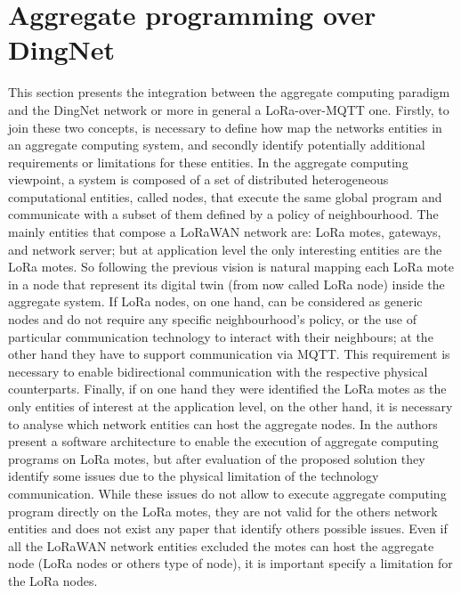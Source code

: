 \section{Aggregate programming over DingNet}
\label{sec:contributionACOverDingNet}
This section presents the integration between the aggregate computing paradigm and the DingNet network or more in general a LoRa-over-MQTT one.
Firstly, to join these two concepts, is necessary to define how map the networks entities in an aggregate computing system, and secondly identify potentially additional requirements or limitations for these entities.
In the aggregate computing viewpoint, a system is composed of a set of distributed heterogeneous computational entities, called nodes, that execute the same global program and communicate with a subset of them defined by a policy of neighbourhood. 
The mainly entities that compose a LoRaWAN network are: LoRa motes, gateways, and network server; but at application level the only interesting entities are the LoRa motes.
So following the previous vision is natural mapping each LoRa mote in a node that represent its digital twin (from now called LoRa node) inside the aggregate system.
If LoRa nodes, on one hand, can be considered as generic nodes and do not require any specific neighbourhood's policy, or the use of particular communication technology to interact with their neighbours; at the other hand they have to support communication via MQTT. 
This requirement is necessary to enable bidirectional communication with the respective physical counterparts.
Finally, if on one hand they were identified the LoRa motes as the only entities of interest at the application level, on the other hand, it is necessary to analyse which network entities can host the aggregate nodes. 
In \cite{CCNCPS2018} the authors present a software architecture to enable the execution of aggregate computing programs on LoRa motes, but after evaluation of the proposed solution they identify some issues due to the physical limitation of the technology communication. 
While these issues do not allow to execute aggregate computing program directly on the LoRa motes, they are not valid for the others network entities and does not exist any paper that identify others possible issues.
Even if all the LoRaWAN network entities excluded the motes can host the aggregate node (LoRa nodes or others type of node), it is important specify a limitation for the LoRa nodes. 

